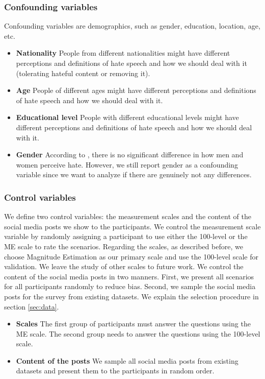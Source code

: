 \subsubsection{Confounding variables}
%
Confounding variables are demographics, such as gender, education, location, age, etc.
%
\begin{itemize}
    \item \textbf{Nationality} People from different nationalities might have different perceptions and definitions of hate speech and how we should deal with it (tolerating hateful content or removing it).
    \item \textbf{Age} People of different ages might have different perceptions and definitions of hate speech and how we should deal with it.
    \item \textbf{Educational level} People with different educational levels might have different perceptions and definitions of hate speech and how we should deal with it.
    \item \textbf{Gender} According to \cite{gold2018women}, there is no significant difference in how men and women perceive hate. However, we still report gender as a confounding variable since we want to analyze if there are genuinely not any differences.
\end{itemize}

\subsubsection{Control variables}
%
We define two control variables: the measurement scales and the content of the social media posts we show to the participants.
%
We control the measurement scale variable by randomly assigning a participant to use either the 100-level or the ME scale to rate the scenarios.
%
Regarding the scales, as described before, we choose Magnitude Estimation as our primary scale and use the 100-level scale for validation.
%
We leave the study of other scales to future work.
%
We control the content of the social media posts in two manners.
%
First, we present all scenarios for all participants randomly to reduce bias.
%
Second, we sample the social media posts for the survey from existing datasets.
% 
We explain the selection procedure in section \ref{sec:data}.
%
\begin{itemize}
    \item \textbf{Scales} The first group of participants must answer the questions using the ME scale. The second group needs to answer the questions using the 100-level scale.
    \item \textbf{Content of the posts} We sample all social media posts from existing datasets and present them to the participants in random order.
\end{itemize}

